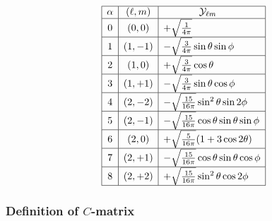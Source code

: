 \documentclass[letterpaper]{article}
\newcommand{\YY}{\mc Y}
\begin{document}
$$\begin{array}{|c|c|l|}\hline
\alpha & (\ell, m) & \hspace{0.5in} \YY_{\ell m}          \\\hline
0      & (   0, 0) & +\sqrt\frac{1}{4\pi} \\\hline
1      & (   1,-1) & -\sqrt{\frac{3}{4\pi}} \sin\theta\sin\phi  \\\hline
2      & (   1, 0) & +\sqrt\frac{3}{4\pi} \cos\theta          \\\hline
3      & (   1,+1) & -\sqrt{\frac{3}{4\pi}} \sin\theta\cos\phi  \\\hline
4      & (   2,-2) & -\sqrt\frac{15}{16\pi} \sin^2\theta \sin 2\phi \\ \hline
5      & (   2,-1) & -\sqrt\frac{15}{16\pi} \cos\theta \sin\theta \sin\phi \\ \hline
6      & (   2, 0) & +\sqrt\frac{5}{16\pi}(1+3\cos 2\theta) \\ \hline
7      & (   2,+1) & -\sqrt\frac{15}{16\pi} \cos\theta \sin\theta \cos\phi \\ \hline
8      & (   2,+2) & +\sqrt\frac{15}{16\pi} \sin^2\theta \cos 2\phi \\ \hline
\end{array}$$
\renewcommand{\arraystretch}{1.0}

\subsubsection*{Definition of $C$-matrix}
\end{document}
